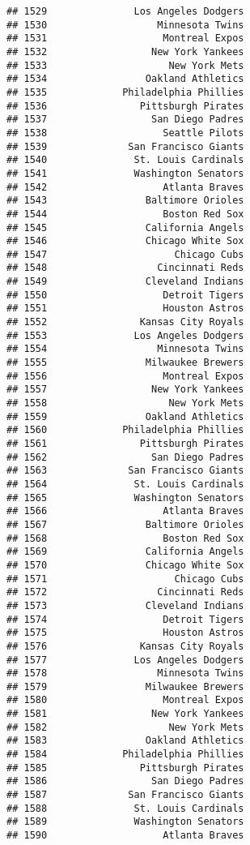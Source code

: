 \documentclass[]{article}
\begin{document}
\begin{verbatim}
## 1529               Los Angeles Dodgers
## 1530                   Minnesota Twins
## 1531                    Montreal Expos
## 1532                  New York Yankees
## 1533                     New York Mets
## 1534                 Oakland Athletics
## 1535             Philadelphia Phillies
## 1536                Pittsburgh Pirates
## 1537                  San Diego Padres
## 1538                    Seattle Pilots
## 1539              San Francisco Giants
## 1540               St. Louis Cardinals
## 1541               Washington Senators
## 1542                    Atlanta Braves
## 1543                 Baltimore Orioles
## 1544                    Boston Red Sox
## 1545                 California Angels
## 1546                 Chicago White Sox
## 1547                      Chicago Cubs
## 1548                   Cincinnati Reds
## 1549                 Cleveland Indians
## 1550                    Detroit Tigers
## 1551                    Houston Astros
## 1552                Kansas City Royals
## 1553               Los Angeles Dodgers
## 1554                   Minnesota Twins
## 1555                 Milwaukee Brewers
## 1556                    Montreal Expos
## 1557                  New York Yankees
## 1558                     New York Mets
## 1559                 Oakland Athletics
## 1560             Philadelphia Phillies
## 1561                Pittsburgh Pirates
## 1562                  San Diego Padres
## 1563              San Francisco Giants
## 1564               St. Louis Cardinals
## 1565               Washington Senators
## 1566                    Atlanta Braves
## 1567                 Baltimore Orioles
## 1568                    Boston Red Sox
## 1569                 California Angels
## 1570                 Chicago White Sox
## 1571                      Chicago Cubs
## 1572                   Cincinnati Reds
## 1573                 Cleveland Indians
## 1574                    Detroit Tigers
## 1575                    Houston Astros
## 1576                Kansas City Royals
## 1577               Los Angeles Dodgers
## 1578                   Minnesota Twins
## 1579                 Milwaukee Brewers
## 1580                    Montreal Expos
## 1581                  New York Yankees
## 1582                     New York Mets
## 1583                 Oakland Athletics
## 1584             Philadelphia Phillies
## 1585                Pittsburgh Pirates
## 1586                  San Diego Padres
## 1587              San Francisco Giants
## 1588               St. Louis Cardinals
## 1589               Washington Senators
## 1590                    Atlanta Braves

\end{verbatim}
\end{document}
